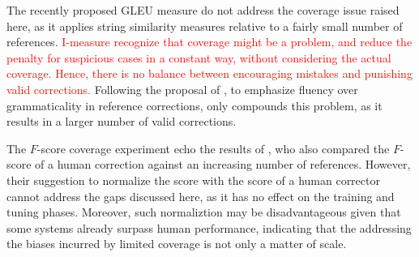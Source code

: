 \documentclass[letterpaper, 11pt]{article}
\newcommand{\lc}[1]{\footnote{\color{blue}LC: #1}}
\begin{document}
The recently proposed GLEU \cite{napoles2015ground} measure do not address
the coverage issue raised here, as it applies string similarity measures relative to a fairly small number of references.\textcolor{red}{ {\sc I-measure} \cite{felice2015towards} recognize that coverage might be a problem, and reduce the penalty for suspicious cases in a constant way, without considering the actual coverage. Hence, there is no balance between encouraging mistakes and punishing valid corrections.}
Following the proposal of , to emphasize fluency over grammaticality in reference corrections, only compounds this problem, as it results in a larger number of valid corrections.

The $F$-score coverage experiment echo the results of ,
who also compared the $F$-score of a human correction against an increasing number of references.
However, their suggestion to normalize the score
with the score of a human corrector cannot address the gaps discussed here,
as it has no effect on the training and tuning phases.
Moreover, such normaliztion may be disadvantageous given that some systems already surpass human performance,
indicating that the addressing the biases incurred by limited coverage is not only a matter of scale.


\end{document}
